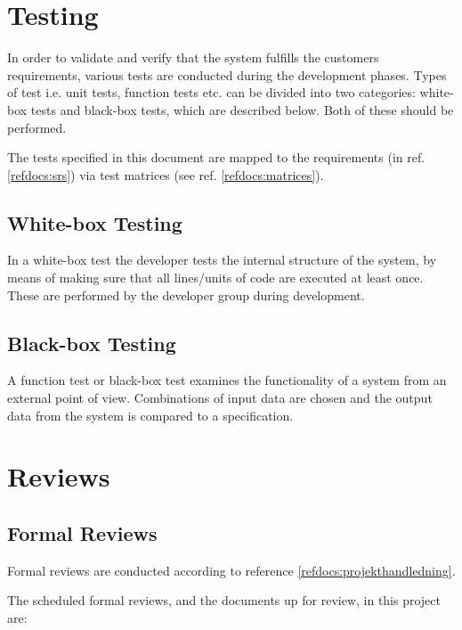 \documentclass[a4paper]{article}
\begin{document}
\section{Testing}
In order to validate and verify that the system fulfills the customers requirements, various tests are conducted during the development phases. Types of test i.e. unit tests, function tests etc. can be divided into two categories: white-box tests and black-box tests, which are described below. Both of these should be performed.

The tests specified in this document are mapped to the requirements (in ref. \ref{refdocs:srs}) via test matrices (see ref. \ref{refdocs:matrices}).

\subsection{White-box Testing}
In a white-box test the developer tests the internal structure of the system, by means of making sure that all lines/units of code are executed at least once. These are performed by the developer group during development.

\subsection{Black-box Testing}
A function test or black-box test examines the functionality of a system from an external point of view. Combinations of input data are chosen and the output data from the system is compared to a specification.


\section{Reviews}

\subsection{Formal Reviews}
Formal reviews are conducted according to reference \ref{refdocs:projekthandledning}.

The scheduled formal reviews, and the documents up for review, in this project are:
\end{document}
